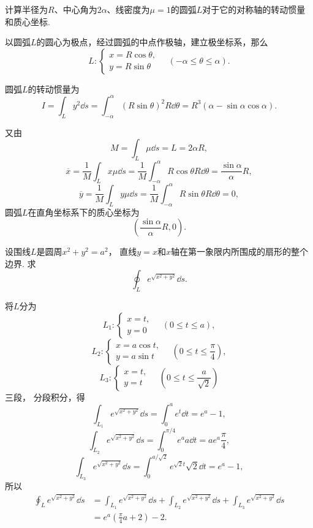 \begin{example}
计算半径为\(R\)、中心角为\(2\alpha\)、线密度为\(\mu=1\)的圆弧\(L\)对于它的对称轴的转动惯量和质心坐标.
\begin{solution}
以圆弧\(L\)的圆心为极点，经过圆弧的中点作极轴，建立极坐标系，那么\[
	L: \left\{ \begin{array}{l}
		x = R\cos\theta, \\
		y = R\sin\theta
	\end{array} \right.
	\quad(-\alpha\leq\theta\leq\alpha).
\]

圆弧\(L\)的转动惯量为\[
	I = \int_L y^2 \dd{s}
	= \int_{-\alpha}^\alpha (R\sin\theta)^2 R\dd{\theta}
	= R^3 (\alpha - \sin\alpha \cos\alpha).
\]

又由\[
	M = \int_L \mu \dd{s} = L = 2\alpha R,
\]\[
	\overline{x}
	= \frac{1}{M} \int_L x \mu \dd{s}
	= \frac{1}{M} \int_{-\alpha}^\alpha R\cos\theta R\dd{\theta}
	= \frac{\sin\alpha}{\alpha}R,
\]\[
	\overline{y}
	= \frac{1}{M} \int_L y \mu \dd{s}
	= \frac{1}{M} \int_{-\alpha}^\alpha R\sin\theta R\dd{\theta}
	= 0,
\]
圆弧\(L\)在直角坐标系下的质心坐标为\[
	\left(
		\frac{\sin\alpha}{\alpha}R,0
	\right).
\]
\end{solution}
\end{example}

\begin{example}
设围线\(L\)是圆周\(x^2+y^2=a^2\)，
直线\(y=x\)和\(x\)轴在第一象限内所围成的扇形的整个边界.
求\[
	\oint_L e^{\sqrt{x^2+y^2}} \dd{s}.
\]
\begin{solution}
将\(L\)分为\[
	L_1: \left\{ \begin{array}{l}
		x = t, \\
		y = 0
	\end{array} \right.
	\quad(0 \leq t \leq a),
\]\[
	L_2: \left\{ \begin{array}{l}
		x = a \cos t, \\
		y = a \sin t
	\end{array} \right.
	\quad(0 \leq t \leq \frac{\pi}{4}),
\]\[
	L_3: \left\{ \begin{array}{l}
		x = t, \\
		y = t
	\end{array} \right.
	\quad(0 \leq t \leq \frac{a}{\sqrt{2}})
\]三段，
分段积分，得\[
	\int_{L_1} e^{\sqrt{x^2+y^2}} \dd{s}
	= \int_0^a e^t \dd{t}
	= e^a-1,
\]\[
	\int_{L_2} e^{\sqrt{x^2+y^2}} \dd{s}
	= \int_0^{\pi/4} e^a a \dd{t}
	= a e^a \frac{\pi}{4},
\]\[
	\int_{L_3} e^{\sqrt{x^2+y^2}} \dd{s}
	= \int_0^{a/\sqrt{2}} e^{\sqrt{2}t} \sqrt{2} \dd{t}
	= e^a-1,
\]
所以\begin{align*}
	\oint_L e^{\sqrt{x^2+y^2}} \dd{s}
	&= \int_{L_1} e^{\sqrt{x^2+y^2}} \dd{s}
	+ \int_{L_2} e^{\sqrt{x^2+y^2}} \dd{s}
	+ \int_{L_3} e^{\sqrt{x^2+y^2}} \dd{s} \\
	&= e^a \left(\frac{\pi}{4}a + 2\right) - 2.
\end{align*}
\end{solution}
\end{example}


